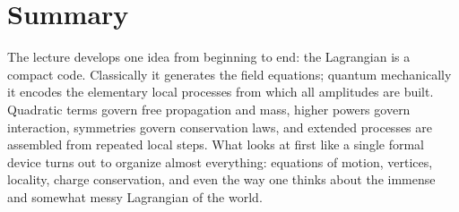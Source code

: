 \section{Summary}

The lecture develops one idea from beginning to end: the Lagrangian is a compact code. Classically it generates the field equations; quantum mechanically it encodes the elementary local processes from which all amplitudes are built. Quadratic terms govern free propagation and mass, higher powers govern interaction, symmetries govern conservation laws, and extended processes are assembled from repeated local steps. What looks at first like a single formal device turns out to organize almost everything: equations of motion, vertices, locality, charge conservation, and even the way one thinks about the immense and somewhat messy Lagrangian of the world.